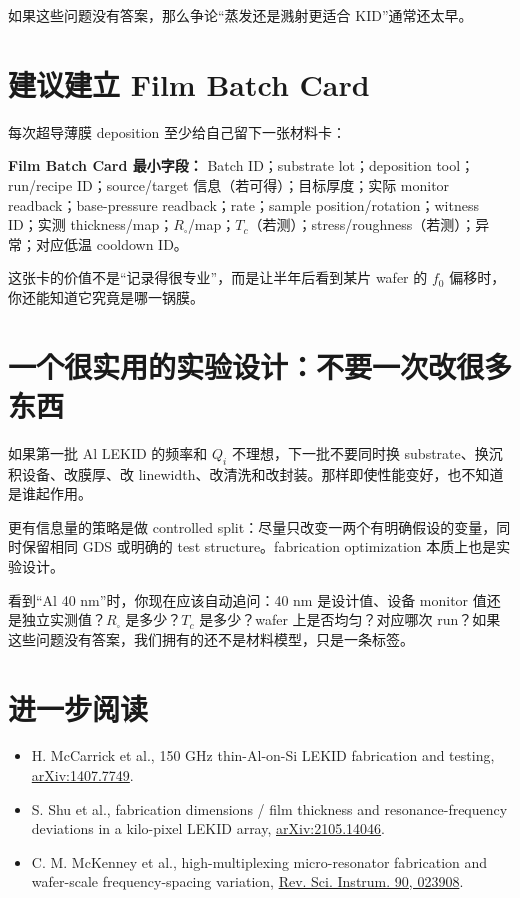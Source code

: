 如果这些问题没有答案，那么争论“蒸发还是溅射更适合 KID”通常还太早。

\section{建议建立 Film Batch Card}

每次超导薄膜 deposition 至少给自己留下一张材料卡：

\begin{measurebox}
\textbf{Film Batch Card 最小字段：}
Batch ID；substrate lot；deposition tool；run/recipe ID；source/target 信息（若可得）；目标厚度；实际 monitor readback；base-pressure readback；rate；sample position/rotation；witness ID；实测 thickness/map；$R_\square$/map；$T_c$（若测）；stress/roughness（若测）；异常；对应低温 cooldown ID。
\end{measurebox}

这张卡的价值不是“记录得很专业”，而是让半年后看到某片 wafer 的 $f_0$ 偏移时，你还能知道它究竟是哪一锅膜。

\section{一个很实用的实验设计：不要一次改很多东西}

如果第一批 Al LEKID 的频率和 $Q_i$ 不理想，下一批不要同时换 substrate、换沉积设备、改膜厚、改 linewidth、改清洗和改封装。那样即使性能变好，也不知道是谁起作用。

更有信息量的策略是做 controlled split：尽量只改变一两个有明确假设的变量，同时保留相同 GDS 或明确的 test structure。fabrication optimization 本质上也是实验设计。

\begin{checkpointbox}
看到“Al 40 nm”时，你现在应该自动追问：40 nm 是设计值、设备 monitor 值还是独立实测值？$R_\square$ 是多少？$T_c$ 是多少？wafer 上是否均匀？对应哪次 run？如果这些问题没有答案，我们拥有的还不是材料模型，只是一条标签。
\end{checkpointbox}

\section*{进一步阅读}

\begin{itemize}
  \item H. McCarrick et al., 150 GHz thin-Al-on-Si LEKID fabrication and testing, \href{https://arxiv.org/abs/1407.7749}{arXiv:1407.7749}.
  \item S. Shu et al., fabrication dimensions / film thickness and resonance-frequency deviations in a kilo-pixel LEKID array, \href{https://arxiv.org/abs/2105.14046}{arXiv:2105.14046}.
  \item C. M. McKenney et al., high-multiplexing micro-resonator fabrication and wafer-scale frequency-spacing variation, \href{https://doi.org/10.1063/1.5037301}{Rev. Sci. Instrum. 90, 023908}.
\end{itemize}
